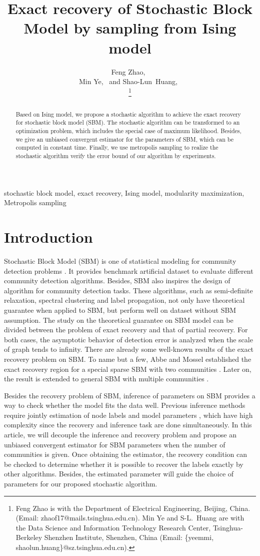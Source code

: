 \documentclass[journal]{IEEEtran}
\title{Exact recovery of Stochastic Block Model by sampling from Ising model}
\author{
	Feng Zhao,~\IEEEmembership{Student Member, IEEE}\\
	Min Ye,~\IEEEmembership{Member, IEEE} and
	Shao-Lun~Huang,~\IEEEmembership{Member, IEEE}\\
	\thanks{Feng Zhao is with the
		Department of Electrical Engineering, Beijing, China.
		(Email: zhaof17@mails.tsinghua.edu.cn).
		Min Ye and S-L.~Huang are with the Data Science and Information
		Technology Research Center, Tsinghua-Berkeley Shenzhen Institute,
		Shenzhen, China (Email: \{yeemmi, shaolun.huang\}@sz.tsinghua.edu.cn).
	}}
\newcommand{\1}{\mathbbm{1}}
\begin{document}
	\maketitle
\begin{abstract}
	Based on Ising model, we propose a stochastic algorithm to achieve the exact recovery for stochastic block model (SBM).
	The stochastic algorithm can be transformed to an optimization problem, which includes the special case of maximum likelihood.
	Besides, we give an unbiased convergent estimator for the parameters of SBM, which can be computed in constant time.
	Finally, we use metropolis sampling to realize the stochastic algorithm verify the error bound of our algorithm by experiments.
\end{abstract}
\begin{IEEEkeywords}
	stochastic block model, exact recovery, Ising model, modularity maximization, Metropolis sampling
\end{IEEEkeywords}
\section{Introduction}
Stochastic Block Model (SBM) is one of statistical modeling for community detection problems  \cite{holland1983stochastic, abbe2017community}.
It provides benchmark artificial dataset to evaluate different community detection algorithms.
Besides, SBM also inspires the design of algorithm for community detection tasks. These algorithms, such as
semi-definite relaxation, spectral clustering and label propagation, not only have theoretical guarantee when applied to SBM,
but perform well on dataset without SBM assumption. The study on the theoretical guarantee on SBM model can be divided between
the problem of exact recovery and that of partial recovery. For both cases, the asymptotic behavior of detection error
is analyzed when the scale of graph tends to infinity. There are already some well-known results of the exact recovery problem
on SBM.	To name but a few, Abbe and Mossel established the exact recovery region for a special sparse SBM with two communities  \cite{abbe2015exact, mossel2016}.
Later on, the result is extended to general SBM with multiple communities \cite{abbe2015community}.

Besides the recovery problem of SBM, inference of parameters on SBM provides a way to check whether the model fits the data well.
Previous inference methods require jointly estimation of node labels and model parameters \cite{nowicki2001estimation}, which have high complexity since the recovery and inference task are done simultaneously.
In this article, we will decouple the inference and recovery problem and propose an unbiased convergent estimator for SBM parameters when the number of communities is given. Once obtaining the estimator, the recovery condition can be checked to determine whether it is possible to recover the labels
exactly by other algorithms. Besides, the estimated parameter will guide the choice of parameters for our proposed stochastic algorithm.
\end{document}
